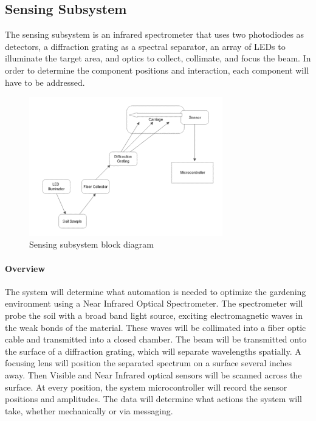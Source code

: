 \subsection{Sensing Subsystem}
\label{sec:sensing_subsystem}
The sensing subsystem is an infrared spectrometer that uses two photodiodes as detectors, a diffraction grating as a spectral separator, an array of LEDs to illuminate the target area, and optics to collect, collimate, and focus the beam. In order to determine the component positions and interaction, each component will have to be addressed.
\begin{figure}[H]
    \caption{Sensing subsystem block diagram}
    \centering
    \includegraphics[width=0.75\textwidth]{images/OpticsBlockDiagram.png}
\end{figure}


\paragraph{Overview} The system will determine what automation is needed to optimize the gardening environment using a Near Infrared Optical Spectrometer. The spectrometer will probe the soil with a broad band light source, exciting electromagnetic waves in the weak bonds of the material. These waves will be collimated into a fiber optic cable and transmitted into a closed chamber. The beam will be transmitted onto the surface of a diffraction grating, which will separate wavelengths spatially. A focusing lens will position the separated spectrum on a surface several inches away. Then Visible and Near Infrared optical sensors will be scanned across the surface. At every position, the system microcontroller will record the sensor positions and amplitudes. The data will determine what actions the system will take, whether mechanically or via messaging.

